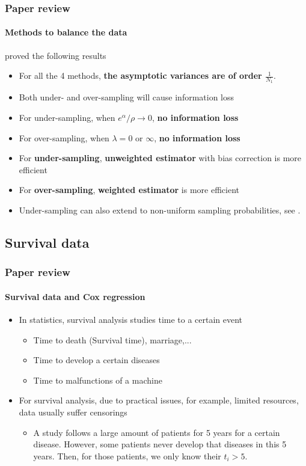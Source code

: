 \documentclass{beamer}
\newcommand{\red}{\color{red}}
\newcommand{\blue}{\color{blue}}
\newcommand{\rhl}[1]{{\red \textbf{#1}}}
\newcommand{\bhl}[1]{{\blue \textbf{#1}}}
\begin{document}
    \begin{frame}
        \frametitle{Paper review}
        \framesubtitle{Methods to balance the data}
        \cite{wang2020logistic} proved the following results
        \begin{itemize}
            \item For all the 4 methods, \rhl{the asymptotic variances are of order $\frac{1}{N_1}$}.
            \item Both under- and over-sampling will cause information loss
            \item For under-sampling, when $e^\alpha/\rho\to 0$, \rhl{no information loss}
            \item For over-sampling, when $\lambda=0$ or $\infty$, \rhl{no information loss}
            \item For \bhl{under-sampling}, \bhl{unweighted estimator} with bias correction is more efficient
            \item For \bhl{over-sampling}, \bhl{weighted estimator} is more efficient
        \end{itemize}
        
        \begin{itemize}
            \item Under-sampling can also extend to non-uniform sampling
              probabilities, see \cite{wang2021nonuniform}. 
        \end{itemize}    
    \end{frame}

    \subsection{Survival data}

    \begin{frame}
        \frametitle{Paper review}
        \framesubtitle{Survival data and Cox regression}
        \begin{itemize}
            \item In statistics, survival analysis studies time to a certain event
            \begin{itemize}
                \item Time to death (Survival time), marriage,...
                \item Time to develop a certain diseases
                \item Time to malfunctions of a machine
            \end{itemize}
            \item For survival analysis, due to practical issues, for example, limited resources, data usually suffer censorings
            \begin{itemize}
                \item A study follows a large amount of patients for 5 years for a certain disease. However, some patients never develop that diseases in this 5 years. Then, for those patients, we only know their $t_i>5$.
            \end{itemize}
        \end{itemize}
    \end{frame}
\end{document}
